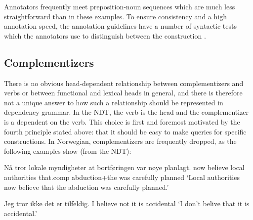\documentclass[11pt,a4paper]{article}
\begin{document}
Annotators frequently meet preposition-noun sequences which are much less straightforward than in these examples.
To ensure consistency and a high annotation speed, the annotation guidelines have a number of syntactic tests which the annotators use to distinguish between the construction \cite[54-56]{Kin:Sol:Eri:2013}.

\subsection{Complementizers}
There is no obvious head-dependent relationship between complementizers and verbs or between functional and lexical heads in general, and there is therefore not a unique answer to how such a relationship should be represented in dependency grammar.
In the NDT, the verb is the head and the complementizer is a dependent on the verb. This choice is first and foremost motivated by the fourth principle stated above: that it should be easy to make queries for specific constructions. In Norwegian, complementizers are frequently dropped, as the following examples show (from the NDT):
\begin{examples}
\item\label{ex:medat}
\gll Nå tror lokale myndigheter at bortføringen var nøye planlagt.
now believe local authorities that.comp abduction+the was carefully planned
\glt `Local authorities now believe that the abduction was carefully planned.'
\glend

\item\label{ex:utenat}
\gll Jeg tror ikke det er tilfeldig.
I believe not it is accidental
\glt `I don't belive that it is accidental.'
\glend
\end{examples}
\end{document}
